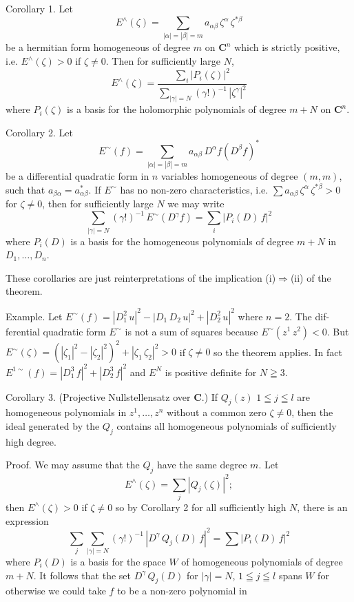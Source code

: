 \documentclass[11pt]{article}
\begin{document}
Corollary 1. Let
\[ E^{\wedge}(\zeta)=\sum_{|\alpha|=|\beta|=m} a_{\alpha\beta}\,\zeta^{\alpha}\,\zeta^{*\beta} \]
be a hermitian form homogeneous of degree $m$ on $\mathbf{C}^n$ which is strictly
positive, i.e. $E^{\wedge}(\zeta)>0$ if $\zeta\neq 0$. Then for sufficiently large $N$,
\[ E^{\wedge}(\zeta)=\frac{\sum\limits_{i}|P_i(\zeta)|^2}{\sum\limits_{|\gamma|=N}(\gamma!)^{-1}\,|\zeta^{\gamma}|^2} \]
where $P_i(\zeta)$ is a basis for the holomorphic polynomials of degree $m+N$ on $\mathbf{C}^n$.

Corollary 2. Let
\[ E^{\sim}(f)=\sum_{|\alpha|=|\beta|=m} a_{\alpha\beta}\,D^{\alpha}f(D^{\beta}f)^* \]
be a differential quadratic form in $n$ variables homogeneous of degree
$(m,m)$, such that $a_{\beta\alpha}=a^*_{\alpha\beta}$. If $E^{\sim}$ has no non-zero characteristics, i.e.
$\sum a_{\alpha\beta}\,\zeta^{\alpha}\,\zeta^{*\beta}>0$ for $\zeta\neq 0$, then for sufficiently large $N$ we may write
\[ \sum_{|\gamma|=N}(\gamma!)^{-1}\,E^{\sim}(D^{\gamma}f)=\sum_{i}|P_i(D)\,f|^2 \]
where $P_i(D)$ is a basis for the homogeneous polynomials of degree $m+N$
in $D_1,\dots,D_n$.

These corollaries are just reinterpretations of the implication (i)$\Rightarrow$(ii)
of the theorem.

Example. Let $E^{\sim}(f)=|D_1^2\,u|^2-|D_1\,D_2\,u|^2+|D_2^2\,u|^2$ where $n=2$. The dif-%
ferential quadratic form $E^{\sim}$ is not a sum of squares because $E^{\sim}(z^1\,z^2)<0$.
But $E^{\sim}(\zeta)=(|\zeta_1|^2-|\zeta_2|^2)^2+|\zeta_1\,\zeta_2|^2>0$ if $\zeta\neq 0$ so the theorem applies.
In fact $E^{1\sim}(f)=|D_1^3\,f|^2+|D_2^3\,f|^2$ and $E^N$ is positive definite for $N\geqq 3$.

Corollary 3. (Projective Nullstellensatz over $\mathbf{C}$.) If $Q_j(z)$ $1\leqq j\leqq l$ are
homogeneous polynomials in $z^1,\dots,z^n$ without a common zero $\zeta\neq 0$, then
the ideal generated by the $Q_j$ contains all homogeneous polynomials of
sufficiently high degree.

Proof. We may assume that the $Q_j$ have the same degree $m$. Let
\[ E^{\wedge}(\zeta)=\sum_{j}|Q_j(\zeta)|^2; \]
then $E^{\wedge}(\zeta)>0$ if $\zeta\neq 0$ so by Corollary 2 for all sufficiently high $N$, there
is an expression
\[ \sum_{j}\sum_{|\gamma|=N}(\gamma!)^{-1}\,|D^{\gamma}\,Q_j(D)\,f|^2=\sum|P_i(D)\,f|^2 \]
where $P_i(D)$ is a basis for the space $W$ of homogeneous polynomials
of degree $m+N$. It follows that the set $D^{\gamma}\,Q_j(D)$ for $|\gamma|=N$, $1\leqq j\leqq l$
spans $W$ for otherwise we could take $f$ to be a non-zero polynomial in
\end{document}
